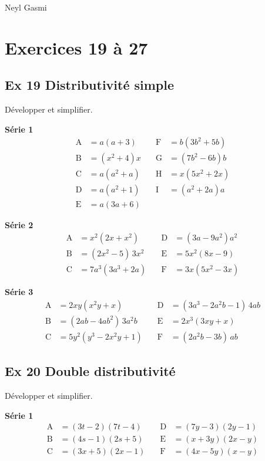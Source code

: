 \documentclass[a4paper,11pt]{article}
\begin{document}
Neyl Gasmi

\section*{Exercices 19 à 27}


\subsection*{Ex 19 \; Distributivité simple}
Développer et simplifier.

\textbf{Série 1}
\[
\begin{aligned}
\mathrm{A}&=a(a+3) &\quad \mathrm{F}&=b(3b^{2}+5b)\\
\mathrm{B}&=(x^{2}+4)x &\quad \mathrm{G}&=(7b^{2}-6b)b\\
\mathrm{C}&=a(a^{2}+a) &\quad \mathrm{H}&=x(5x^{2}+2x)\\
\mathrm{D}&=a(a^{2}+1) &\quad \mathrm{I}&=(a^{2}+2a)a\\
\mathrm{E}&=a(3a+6)
\end{aligned}
\]

\textbf{Série 2}
\[
\begin{aligned}
\mathrm{A}&=x^{2}(2x+x^{2}) &\quad \mathrm{D}&=(3a-9a^{2})a^{2}\\
\mathrm{B}&=(2x^{2}-5)\,3x^{2} &\quad \mathrm{E}&=5x^{2}(8x-9)\\
\mathrm{C}&=7a^{3}(3a^{3}+2a) &\quad \mathrm{F}&=3x(5x^{2}-3x)
\end{aligned}
\]

\textbf{Série 3}
\[
\begin{aligned}
\mathrm{A}&=2xy(x^{2}y+x) &\quad \mathrm{D}&=(3a^{3}-2a^{2}b-1)\,4ab\\
\mathrm{B}&=(2ab-4ab^{2})\,3a^{2}b &\quad \mathrm{E}&=2x^{3}(3xy+x)\\
\mathrm{C}&=5y^{2}(y^{3}-2x^{2}y+1) &\quad \mathrm{F}&=(2a^{2}b-3b)\,ab
\end{aligned}
\]


\subsection*{Ex 20 \; Double distributivité}
Développer et simplifier.

\textbf{Série 1}
\[
\begin{aligned}
\mathrm{A}&=(3t-2)(7t-4) &\quad \mathrm{D}&=(7y-3)(2y-1)\\
\mathrm{B}&=(4s-1)(2s+5) &\quad \mathrm{E}&=(x+3y)(2x-y)\\
\mathrm{C}&=(3x+5)(2x-1) &\quad \mathrm{F}&=(4x-5y)(x-y)
\end{aligned}
\]
\end{document}
